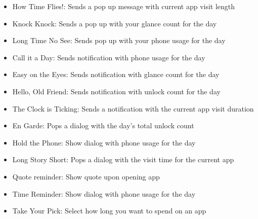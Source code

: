 \begin{small}
\begin{itemize}
    \item How Time Flies!: Sends a pop up message with current app visit length
    \item Knock Knock: Sends a pop up with your glance count for the day
    \item Long Time No See: Sends pop up with your phone usage for the day
    \item Call it a Day: Sends notification with phone usage for the day
    \item Easy on the Eyes: Sends notification with glance count for the day
    \item Hello, Old Friend: Sends notification with unlock count for the day
    \item The Clock is Ticking: Sends a notification with the current app visit duration
    \item En Garde: Pops a dialog with the day's total unlock count
    \item Hold the Phone: Show dialog with phone usage for the day
    \item Long Story Short: Pops a dialog with the visit time for the current app
    \item Quote reminder: Show quote upon opening app
    \item Time Reminder: Show dialog with phone usage for the day
    \item Take Your Pick: Select how long you want to spend on an app
\end{itemize}
\end{small}
